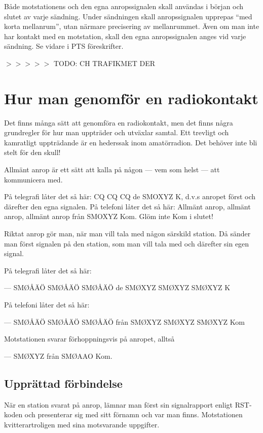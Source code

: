 Både motstationens och den egna anropssignalen skall användas i början
och slutet av varje sändning.  Under sändningen skall anropssignalen
upprepas ``med korta mellanrum'', utan närmare precisering av
mellanrummet.  Även om man inte har kontakt med en motstation, skall
den egna anropssignalen anges vid varje sändning.  Se vidare i PTS
föreskrifter.

$>>>>>$ TODO: CH TRAFIKMET DER


\section{Hur man genomför en radiokontakt}

Det finns många sätt att genomföra en radiokontakt, men det finns
några grundregler för hur man uppträder och utväxlar samtal. Ett
trevligt och kamratligt uppträdande är en hederssak inom
amatörradion. Det behöver inte bli stelt för den skull!

Allmänt anrop är ett sätt att kalla på någon
--- vem som helst --- att kommunicera med.

På telegrafi låter det så här: CQ CQ CQ de SMOXYZ K, d.v.s anropet
först och därefter den egna signalen.  På telefoni låter det så här:
Allmänt anrop, allmänt anrop, allmänt anrop från SMOXYZ Kom. Glöm inte
Kom i slutet!

Riktat anrop gör man, när man vill tala med någon särskild station. Då
sänder man först signalen på den station, som man vill tala med och
därefter sin egen signal.

På telegrafi låter det så här:

--- SMØÅÄÖ SMØÅÄÖ SMØÅÄÖ de SMØXYZ SMØXYZ SMØXYZ K

På telefoni låter det så här:

--- SMØÅÄÖ SMØÅÄÖ SMØÅÄÖ från SMØXYZ SMØXYZ SMØXYZ Kom

Motstationen svarar förhoppningsvis på anropet, alltså

--- SMØXYZ från SMØAAO Kom.

\subsection{Upprättad förbindelse}

När en station svarat på anrop, lämnar man först sin signalrapport
enligt RST-koden och presenterar sig med sitt förnamn och var man
finns. Motstationen kvitterartroligen med sina motsvarande
uppgifter.

